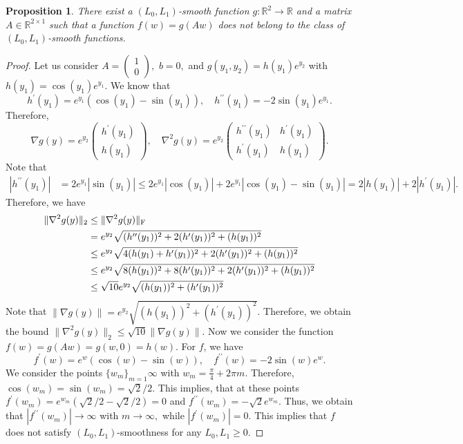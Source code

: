\documentclass[a4paper,11pt]{article}
\newcommand{\R}{\mathbb{R}}
\newcommand{\1}{\mathbbm{1}}
\theoremstyle{plain}
\newtheorem{proposition}[theorem]{Proposition}
\begin{document}
\begin{proposition}
    There exist a $(L_0, L_1)$-smooth function $g \colon\R^2\to\R$ and a matrix $A\in\R^{2\times 1}$ such that a function $f(w) = g(Aw)$ does not belong to the class of $(L_0, L_1)$-smooth functions. 
\end{proposition}
\begin{proof}
    Let us consider $A = \begin{pmatrix}
        1\\0
    \end{pmatrix},$ $b=0,$ and $g(y_1, y_2) = h(y_1)e^{y_2}$ with $h(y_1) = \cos(y_1)e^{y_1}.$ We know that 
    \[
    h^\prime(y_1) = e^{y_1}(\cos(y_1) - \sin(y_1)), \quad h^{\prime\prime}(y_1) = -2\sin(y_1)e^{y_1}.
    \]
    Therefore, 
    \[
    \nabla g(y) = e^{y_2}\begin{pmatrix}
        h^{\prime}(y_1)\\
        h(y_1)
    \end{pmatrix},
    \quad \nabla^2g(y) = e^{y_2}\begin{pmatrix}
        h^{\prime\prime}(y_1) & h^{\prime}(y_1)\\
        h^{\prime}(y_1) & h(y_1)
    \end{pmatrix}.
    \]
    Note that 
    \begin{align*}
    |h^{\prime\prime}(y_1)| &= 2e^{y_1}|\sin(y_1)| \le 2e^{y_1}|\cos(y_1)| + 2e^{y_1}|\cos(y_1)-\sin(y_1)| = 2|h(y_1)| + 2|h^{\prime}(y_1)|.
    \end{align*}
    Therefore, we have 
    \begin{align*}
        \|\nabla^2g(y)\|_2 &\le \|\nabla^2g(y)\|_{\rm F}\\
        &= e^{y_2}\sqrt{(h^{\prime\prime}(y_1))^2 + 2(h^{\prime}(y_1))^2 + (h(y_1))^2}\\
        &\le e^{y_2}\sqrt{4(h(y_1) + h^{\prime}(y_1))^2 + 2(h^{\prime}(y_1))^2 + (h(y_1))^2}\\
        &\le e^{y_2}\sqrt{8(h(y_1))^2 + 8(h^{\prime}(y_1))^2 + 2(h^{\prime}(y_1))^2 + (h(y_1))^2}\\
        &\le \sqrt{10}e^{y_2}\sqrt{(h(y_1))^2 + (h^{\prime}(y_1))^2 }
    \end{align*}
    Note that $\|\nabla g(y)\| = e^{y_2}\sqrt{(h(y_1))^2 + (h^{\prime}(y_1))^2 }$. Therefore, we obtain the bound $\|\nabla^2g(y)\|_2 \le \sqrt{10}\|\nabla g(y)\|.$ Now we consider the function $f(w) = g(Aw) = g(w, 0) = h(w).$ For $f$, we have
    \[
    f^{\prime}(w) = e^{w}(\cos(w)-\sin(w)), \quad f^{\prime\prime}(w) = -2\sin(w)e^{w}.
    \]
    We consider the points $\{w_m\}_{m=1}{\infty}$ with $w_m = \frac{\pi}{4}+2\pi m$. Therefore, $\cos(w_m)=\sin(w_m) = \sqrt{2}/2$. This implies, that at these points $f^{\prime}(w_m) = e^{w_m}(\sqrt{2}/2 - \sqrt{2}/2) = 0$ and $f^{\prime\prime}(w_m) = -\sqrt{2}e^{w_m}$. Thus, we obtain that $|f^{\prime\prime}(w_m)| \to \infty$ with $m\to \infty,$ while $|f^{\prime}(w_m)| = 0$. This implies that $f$ does not satisfy $(L_0, L_1)$-smoothness for any $L_0, L_1 \ge 0.$
    
\end{proof}
\end{document}
